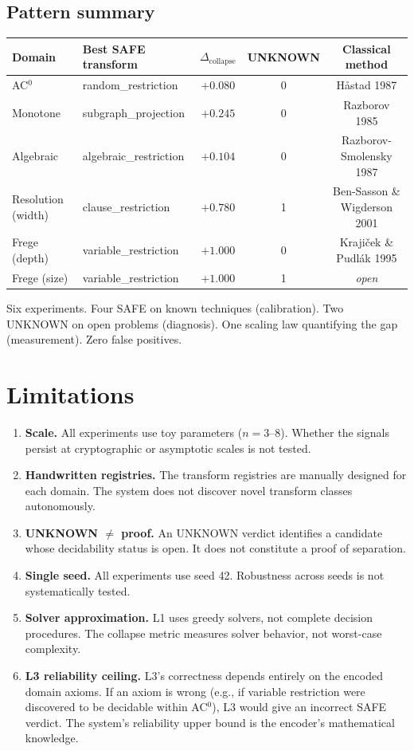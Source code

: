 \documentclass[11pt,a4paper]{article}
\newcommand{\Dcollapse}{\Delta_{\mathrm{collapse}}}
\begin{document}
\subsection{Pattern summary}

\begin{center}
\begin{tabular}{@{}llccc@{}}
\toprule
Domain & Best SAFE transform & $\Dcollapse$ & UNKNOWN & Classical method \\
\midrule
AC$^0$ & random\_restriction & $+0.080$ & 0 & H\r{a}stad 1987 \\
Monotone & subgraph\_projection & $+0.245$ & 0 & Razborov 1985 \\
Algebraic & algebraic\_restriction & $+0.104$ & 0 & Razborov-Smolensky 1987 \\
Resolution (width) & clause\_restriction & $+0.780$ & 1 & Ben-Sasson \& Wigderson 2001 \\
Frege (depth) & variable\_restriction & $+1.000$ & 0 & Kraji\v{c}ek \& Pudl\'{a}k 1995 \\
Frege (size) & variable\_restriction & $+1.000$ & 1 & \emph{open} \\
\bottomrule
\end{tabular}
\end{center}

Six experiments. Four SAFE on known techniques (calibration). Two UNKNOWN on open problems (diagnosis). One scaling law quantifying the gap (measurement). Zero false positives.

\section{Limitations}
\label{sec:limits}

\begin{enumerate}[nosep]
    \item \textbf{Scale.} All experiments use toy parameters ($n = 3$--$8$). Whether the signals persist at cryptographic or asymptotic scales is not tested.
    \item \textbf{Handwritten registries.} The transform registries are manually designed for each domain. The system does not discover novel transform classes autonomously.
    \item \textbf{UNKNOWN $\neq$ proof.} An UNKNOWN verdict identifies a candidate whose decidability status is open. It does not constitute a proof of separation.
    \item \textbf{Single seed.} All experiments use seed 42. Robustness across seeds is not systematically tested.
    \item \textbf{Solver approximation.} L1 uses greedy solvers, not complete decision procedures. The collapse metric measures solver behavior, not worst-case complexity.
    \item \textbf{L3 reliability ceiling.} L3's correctness depends entirely on the encoded domain axioms. If an axiom is wrong (e.g., if variable restriction were discovered to be decidable within AC$^0$), L3 would give an incorrect SAFE verdict. The system's reliability upper bound is the encoder's mathematical knowledge.
\end{enumerate}
\end{document}
